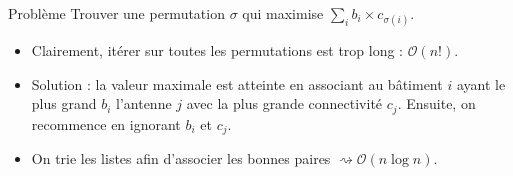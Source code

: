 \begin{frame}
    \frametitle{\problemtitle}
    \begin{block}{Problème}
        Trouver une permutation $\sigma$ qui maximise $\sum_{i} b_i \times c_{\sigma(i)}$.
    \end{block}
    \pause
    \begin{itemize}
        \item<+-> Clairement, itérer sur toutes les permutations est trop long : $\mathcal{O}(n!)$.
        \item<+-> Solution : la valeur maximale est atteinte en associant au bâtiment $i$ ayant le plus grand $b_i$ l'antenne $j$ avec la plus grande connectivité $c_j$. Ensuite, on recommence en ignorant $b_i$ et $c_j$.
        \item<+-> On trie les listes afin d'associer les bonnes paires $\rightsquigarrow \mathcal{O}(n \log n)$.
    \end{itemize}
\end{frame}
